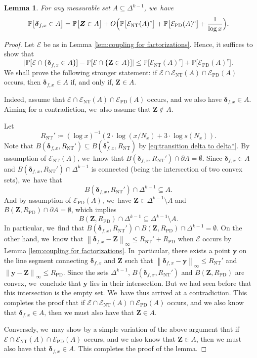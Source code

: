 \documentclass[10pt,a4paper]{article}
\newcommand{\bmy}{{\boldsymbol y}}
\newcommand{\bZ}{{\boldsymbol Z}}
\newcommand{\PP}{\mathbb{P}}
\newcommand{\bolddelta}{\boldsymbol{\delta}}
\newcommand{\EC}{\mathcal{E}}
\newcommand{\maxnorm}[1]{\left\| #1 \right\|_{\infty}}
\newcommand{\simplex}{\Delta^{k-1}}
\newcommand{\bg}{\big}
\newcommand{\bgg}{\Big}
\newcommand{\Rnt}{R_{\mathrm{NT}}}
\newcommand{\Rprob}{R_{\mathrm{PD}}}
\newcommand{\ECnt}{\EC_{\mathrm{NT}}}
\newcommand{\ECprob}{\EC_{\mathrm{PD}}}
\theoremstyle{plain}
\newtheorem{lem}[cor]{Lemma}
\theoremstyle{definition}
\begin{document}
\begin{lem}
\label{lem:sym diff D and Z}
For any measurable set $A\subseteq\simplex$, we~have
\[
\PP\bg[\bolddelta_{f, x} \in A\bg] = \PP\bg[\bZ \in A\bg] + O\Bigl(\PP\bg[\ECnt(A)^c\bg] + \PP\bg[\ECprob(A)^c\bg] + \frac{1}{\log x}\Bigr).
\]
\end{lem}

\begin{proof} Let $\EC$ be as in Lemma \ref{lem:coupling for factorizations}. Hence, it suffices to show that
\begin{equation}
\label{eq:sym diff D and Z on E}
\bgg| \PP\bg[\EC\cap\{\bolddelta_{f, x} \in A\}\bg] - \PP\bg[\EC\cap\{\bZ \in A\}\bg]\bgg| \le \PP\bg[\ECnt(A)^c\bg] + \PP\bg[\ECprob(A)^c\bg].
\end{equation}
We shall prove the following stronger statement: if $\EC\cap \ECnt(A)\cap \ECprob(A)$ occurs, then $\bolddelta_{f, x}\in A$ if, and only if, $\bZ\in A$.

Indeed, assume that $\EC\cap \ECnt(A)\cap \ECprob(A)$ occurs, and we also have $\bolddelta_{f, x}\in A$. Aiming for a contradiction, we~also assume that $\bZ\notin A$.

Let
\[
\Rnt' \coloneqq (\log x)^{-1}(2\cdot \log(x/N_x) + 3\cdot \log s(N_x)).
\]
Note that $B(\bolddelta_{f, x}, \Rnt') \subseteq B(\bolddelta_{f, x}^*, \Rnt)$ by \eqref{eq:transition delta to delta*}. By assumption of $\ECnt(A)$, we~know that \hbox{$B(\bolddelta_{f, x},\Rnt')\cap\partial A=\emptyset$}. Since $\bolddelta_{f, x} \in A$ and $B(\bolddelta_{f, x},\Rnt')\cap \simplex$ is connected (being the intersection of two convex sets), we~have that
\[
B(\bolddelta_{f, x},\Rnt')\cap \simplex \subseteq A.
\]
And by assumption of $\ECprob(A)$, we~have $\bZ \in \simplex \setminus A$ and $B(\bZ,\Rprob)\cap\partial A=\emptyset$, which implies
\[
B(\bZ,\Rprob)\cap \simplex \subseteq \simplex \setminus A.
\]
In particular, we~find that $B(\bolddelta_{f, x}, \Rnt')\cap B(\bZ,\Rprob)\cap \simplex =\emptyset$. On the other hand, we~know that $\maxnorm{\bolddelta_{f, x}-\bZ}\le \Rnt' +\Rprob$ when $\EC$ occurs by Lemma \ref{lem:coupling for factorizations}. In~particular, there exists a point $\bmy$ on the line segment connecting $\bolddelta_{f, x}$ and $\bZ$ such that $\maxnorm{\bolddelta_{f, x}-\bmy}\le \Rnt'$ and $\maxnorm{\bmy-\bZ}\le \Rprob$. Since the sets $\simplex$, $B(\bolddelta_{f, x},\Rnt')$ and $B(\bZ,\Rprob)$ are convex, we~conclude that $\bmy$ lies in their intersection. But we had seen before that this intersection is the empty set. We~have thus arrived at a contradiction. This completes the proof that if $\EC\cap \ECnt(A)\cap \ECprob(A)$ occurs, and we also know that $\bolddelta_{f, x}\in A$, then we must also have that $\bZ\in A$.

Conversely, we~may show by a simple variation of the above argument that if $\EC\cap \ECnt(A)\cap \ECprob(A)$ occurs, and we also know that $\bZ\in A$, then we must also have that $\bolddelta_{f, x}\in A$. This completes the proof of the lemma.
\end{proof}
\end{document}
